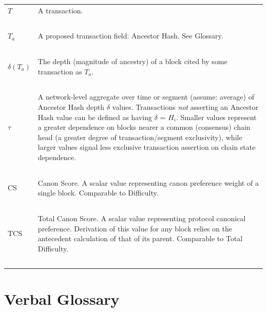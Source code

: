 \documentclass[11pt]{article}
\theoremstyle{plain}
\begin{document}
\begin{table}[H]
{\begin{tabular}{|p{5cm}|p{9cm}|}
$T$ & A transaction. \\~\\

$T_a$ & A proposed transaction field: Ancestor Hash.
See Glossary. \\~\\

$\delta(T_a)$ & The depth (magnitude of ancestry) of a block cited by some
transaction as $T_a$. \\~\\

$\tau$ & A network-level aggregate over time or segment (assume: average) of
Ancestor Hash depth $\delta$ values. Transactions \textit{not} asserting an
Ancestor Hash value can be defined as having $\delta$ = $H_i$.
Smaller values represent a greater dependence on blocks nearer a common
(consensus) chain head (a greater degree of transaction/segment exclusivity),
while larger values signal less exclusive transaction assertion on chain
state dependence.
\\~\\

$\mathrm{CS}$ & Canon Score. A scalar value representing canon preference
weight of a single block. Comparable to Difficulty. \\~\\

$\mathrm{TCS}$ & Total Canon Score. A scalar value representing protocol
canonical preference. Derivation of this value for any block relies on the
antecedent calculation of that of its parent. Comparable to Total Difficulty.
\\~\\

\hline
\end{tabular}
}
\end{table}


\section{\normalsize{Verbal Glossary}}\label{sec: glossary}
\end{document}
